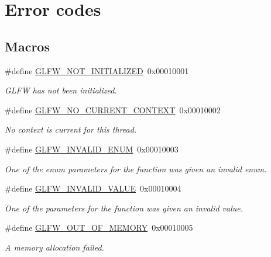 \hypertarget{group__errors}{\section{Error codes}
\label{group__errors}
}
\subsection*{Macros}
\begin{DoxyCompactItemize}
\item 
\#define \hyperlink{group__errors_ga2374ee02c177f12e1fa76ff3ed15e14a}{G\-L\-F\-W\-\_\-\-N\-O\-T\-\_\-\-I\-N\-I\-T\-I\-A\-L\-I\-Z\-E\-D}~0x00010001
\begin{DoxyCompactList}\small\item\em G\-L\-F\-W has not been initialized. \end{DoxyCompactList}\item 
\#define \hyperlink{group__errors_gaa8290386e9528ccb9e42a3a4e16fc0d0}{G\-L\-F\-W\-\_\-\-N\-O\-\_\-\-C\-U\-R\-R\-E\-N\-T\-\_\-\-C\-O\-N\-T\-E\-X\-T}~0x00010002
\begin{DoxyCompactList}\small\item\em No context is current for this thread. \end{DoxyCompactList}\item 
\#define \hyperlink{group__errors_ga76f6bb9c4eea73db675f096b404593ce}{G\-L\-F\-W\-\_\-\-I\-N\-V\-A\-L\-I\-D\-\_\-\-E\-N\-U\-M}~0x00010003
\begin{DoxyCompactList}\small\item\em One of the enum parameters for the function was given an invalid enum. \end{DoxyCompactList}\item 
\#define \hyperlink{group__errors_gaaf2ef9aa8202c2b82ac2d921e554c687}{G\-L\-F\-W\-\_\-\-I\-N\-V\-A\-L\-I\-D\-\_\-\-V\-A\-L\-U\-E}~0x00010004
\begin{DoxyCompactList}\small\item\em One of the parameters for the function was given an invalid value. \end{DoxyCompactList}\item 
\#define \hyperlink{group__errors_ga9023953a2bcb98c2906afd071d21ee7f}{G\-L\-F\-W\-\_\-\-O\-U\-T\-\_\-\-O\-F\-\_\-\-M\-E\-M\-O\-R\-Y}~0x00010005
\begin{DoxyCompactList}\small\item\em A memory allocation failed. \end{DoxyCompactList}\item 

\end{DoxyCompactItemize}
